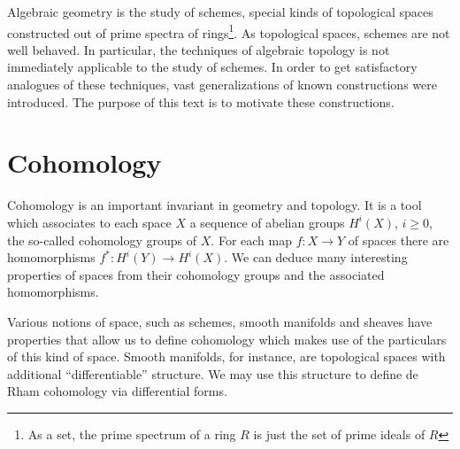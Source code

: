 

Algebraic geometry is the study of schemes, special kinds of topological spaces constructed out of prime spectra of rings\footnote{As a set, the prime spectrum of a ring $R$ is just the set of prime ideals of $R$}. As topological spaces, schemes are not well behaved. In particular, the techniques of algebraic topology is not immediately applicable to the study of schemes. In order to get satisfactory analogues of these techniques, vast generalizations of known constructions were introduced. The purpose of this text is to motivate these constructions.


\section{Cohomology}
Cohomology is an important invariant in geometry and topology. It is a tool which associates to each space $X$ a sequence of abelian groups $H^i(X)$, $i \ge 0$, the so-called cohomology groups of $X$. For each map $f: X \to Y$ of spaces there are homomorphisms $f^*: H^i(Y) \to H^i(X)$. We can deduce many interesting properties of spaces from their cohomology groups and the associated homomorphisms.

Various notions of space, such as schemes, smooth manifolds and sheaves have properties that allow us to define cohomology which makes use of the particulars of this kind of space. Smooth manifolds, for instance, are topological spaces with additional “differentiable” structure.  We may use this structure to define de Rham cohomology via differential forms.

